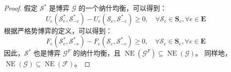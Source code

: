 \begin{proof}
假定 $\mathcal{S}^{*}$ 是博弈 $\mathcal{G}$ 的一个纳什均衡，可以得到：
\begin{equation}
	U_{e}\left(\mathcal{S}_{e}^{*}, \mathcal{S}_{-e}^{*}\right) - U_{e}\left(\mathcal{S}_{e}, \mathcal{S}_{-e}^{*}\right) \geq 0, \quad \forall \mathcal{S}_{e} \in \mathbf{S}_{e}, \forall e \in \mathbf{E}
\end{equation}
根据严格势博弈的定义，可以得到：
\begin{equation}
	F_{e}\left(\mathcal{S}_{e}^{*}, \mathcal{S}_{-e}^{*}\right) - F_{e}\left(\mathcal{S}_{e}, \mathcal{S}_{-e}^{*}\right) \geq 0, \quad \forall \mathcal{S}_{e} \in \mathbf{S}_{e}, \forall e \in \mathbf{E}
\end{equation}
因此，$\mathcal{S}^{*}$ 也是博弈 $\mathcal{G}^{F}$ 的纳什均衡，且 $\operatorname{NE}(\mathcal{G}^{F}) \subseteq \operatorname{NE}(\mathcal{G})$。
同样地，$\operatorname{NE}(\mathcal{G}) \subseteq \operatorname{NE}(\mathcal{F})$。
\end{proof}

